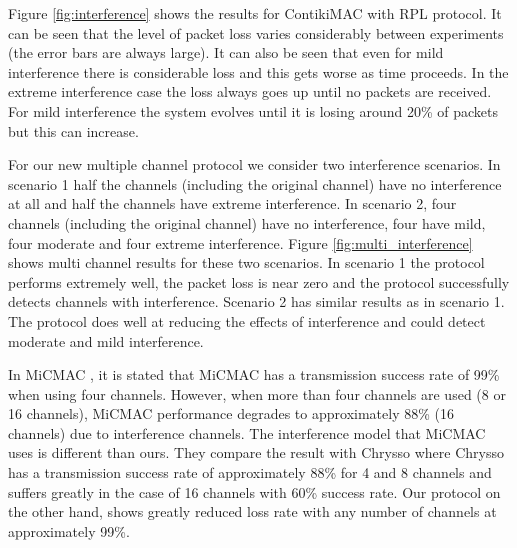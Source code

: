 Figure \ref{fig:interference} shows the results for ContikiMAC with RPL protocol. It can be seen that the level of packet loss varies considerably between experiments (the error bars are always large). It can also be seen that even for mild interference there is considerable loss and this gets worse as time proceeds. In the extreme interference case the loss always goes up until no packets are received. For mild interference the system evolves until it is losing around 20\% of packets but this can increase.

For our new multiple channel protocol we consider two interference scenarios.
In scenario 1 half the channels (including the original channel) have no
interference at all and half the channels have extreme interference.
In scenario 2, four channels (including the original channel) have no
interference, four have mild, four moderate and four extreme interference.
Figure \ref{fig:multi_interference} shows multi channel results for these
two scenarios.  In scenario 1 the protocol performs extremely well, the packet loss is near zero and the protocol successfully detects channels with interference.
Scenario 2 has similar results as in scenario 1. The protocol does well at reducing the effects of interference and could detect moderate and mild interference.

In MiCMAC \cite{micmac}, it is stated that MiCMAC has a transmission success rate of 99\% when using four channels. However, when more than four channels are used (8 or 16 channels), MiCMAC performance degrades to approximately 88\% (16 channels) due to interference channels. The interference model that MiCMAC uses is different than ours. They compare the result with Chrysso where Chrysso has a transmission success rate of approximately 88\% for 4 and 8 channels and suffers greatly in the case of 16 channels with 60\% success rate.
Our protocol on the other hand, shows greatly reduced loss rate with any number of channels at approximately 99\%.

